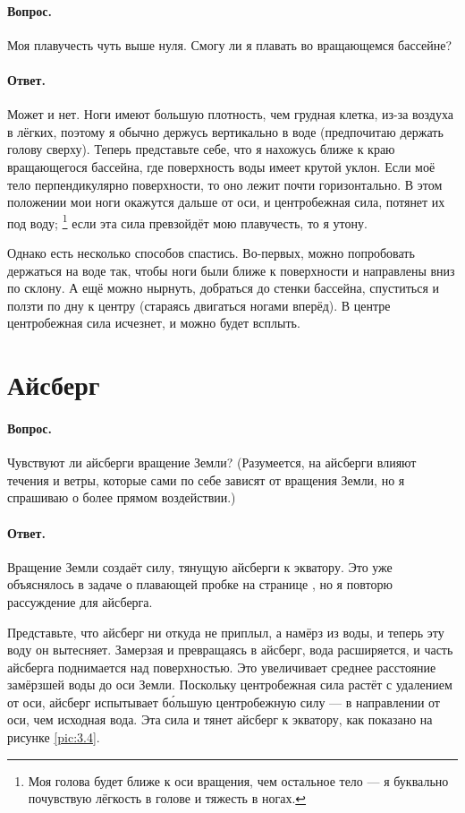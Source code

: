 \paragraph{Вопрос.}
Моя плавучесть чуть выше нуля. Смогу ли я плавать во вращающемся бассейне?

\paragraph{Ответ.}
Может и нет.
Ноги имеют большую плотность, чем грудная клетка, из-за воздуха в лёгких, поэтому я обычно держусь вертикально в воде (предпочитаю держать голову сверху).
Теперь представьте себе, что я нахожусь ближе к краю вращающегося бассейна, где поверхность воды имеет крутой уклон. Если моё тело перпендикулярно поверхности, то оно лежит почти горизонтально.
В этом положении мои ноги окажутся дальше от оси, и центробежная сила, потянет их под воду;%
\footnote{Моя голова будет ближе к оси вращения, чем остальное тело --- я буквально почувствую лёгкость в голове и тяжесть в ногах.}
если эта сила превзойдёт мою плавучесть, то я утону.

Однако есть несколько способов спастись.
Во-первых, можно попробовать держаться на воде так, чтобы ноги были ближе к поверхности и направлены вниз по склону.
А ещё можно нырнуть, добраться до стенки бассейна, спуститься и ползти по дну к центру (стараясь двигаться ногами вперёд).
В центре центробежная сила исчезнет, и можно будет всплыть.

\section{Айсберг}\label{sec:iceberg}

\paragraph{Вопрос.} Чувствуют ли айсберги вращение Земли?
(Разумеется, на айсберги влияют течения и ветры, которые сами по себе зависят от вращения Земли, но я спрашиваю о более прямом воздействии.)

\paragraph{Ответ.}
Вращение Земли создаёт силу, тянущую айсберги к экватору.
Это уже объяснялось в задаче о плавающей пробке на странице \pageref{sec:cork},
но я повторю рассуждение для айсберга.

Представьте, что айсберг ни откуда не приплыл, а намёрз из воды, и теперь эту воду он вытесняет.
Замерзая и превращаясь в айсберг, вода расширяется, и часть айсберга поднимается над поверхностью.
Это увеличивает среднее расстояние замёрзшей воды до оси Земли.
Поскольку центробежная сила растёт с удалением от оси, айсберг испытывает б\'{о}льшую центробежную силу --- в направлении от оси, чем исходная вода.
Эта сила и тянет айсберг к экватору, как показано на рисунке \ref{pic:3.4}.

